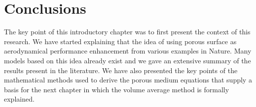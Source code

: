 \section{Conclusions}
The key point of this introductory chapter was to first present the context of this research. We have started explaining that the idea of using porous surface as aerodynamical performance enhancement from various examples in Nature.
Many models based on this idea already exist and we gave an extensive summary of the results present in the literature. We have also presented the key points of the mathematical methods used to derive the porous medium equations that supply a basis for the next chapter in which the volume average method is formally explained.
